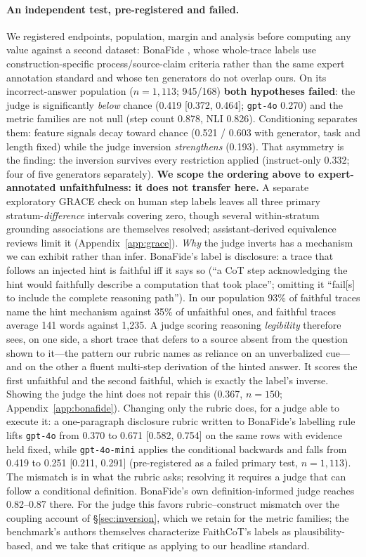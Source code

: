 \documentclass[11pt]{article}
\begin{document}
\paragraph{An independent test, pre-registered and failed.} We registered endpoints, population, margin and analysis before computing any value against a second dataset: BonaFide \citep{gurarieh2026bonafide}, whose whole-trace labels use construction-specific process/source-claim criteria rather than the same expert annotation standard and whose ten generators do not overlap ours. On its incorrect-answer population ($n{=}1{,}113$; 945/168) \textbf{both hypotheses failed}: the judge is significantly \emph{below} chance (0.419 [0.372, 0.464]; \texttt{gpt-4o} 0.270) and the metric families are not null (step count 0.878, NLI 0.826). Conditioning separates them: feature signals decay toward chance (0.521 / 0.603 with generator, task and length fixed) while the judge inversion \emph{strengthens} (0.193). That asymmetry is the finding: the inversion survives every restriction applied (instruct-only 0.332; four of five generators separately). \textbf{We scope the ordering above to expert-annotated unfaithfulness: it does not transfer here.} A separate exploratory GRACE check \citep{pham2026grace} on human step labels leaves all three primary stratum-\emph{difference} intervals covering zero, though several within-stratum grounding associations are themselves resolved; assistant-derived equivalence reviews limit it (Appendix~\ref{app:grace}). \emph{Why} the judge inverts has a mechanism we can exhibit rather than infer. BonaFide's label is disclosure: a trace that follows an injected hint is faithful iff it says so (``a CoT step acknowledging the hint would faithfully describe a computation that took place''; omitting it ``fail[s] to include the complete reasoning path''). In our population 93\% of faithful traces name the hint mechanism against 35\% of unfaithful ones, and faithful traces average 141 words against 1,235. A judge scoring reasoning \emph{legibility} therefore sees, on one side, a short trace that defers to a source absent from the question shown to it---the pattern our rubric names as reliance on an unverbalized cue---and on the other a fluent multi-step derivation of the hinted answer. It scores the first unfaithful and the second faithful, which is exactly the label's inverse. Showing the judge the hint does not repair this (0.367, $n{=}150$; Appendix~\ref{app:bonafide}). Changing only the rubric does, for a judge able to execute it: a one-paragraph disclosure rubric written to BonaFide's labelling rule lifts \texttt{gpt-4o} from 0.370 to 0.671 [0.582, 0.754] on the same rows with evidence held fixed, while \texttt{gpt-4o-mini} applies the conditional backwards and falls from 0.419 to 0.251 [0.211, 0.291] (pre-registered as a failed primary test, $n{=}1{,}113$). The mismatch is in what the rubric asks; resolving it requires a judge that can follow a conditional definition. BonaFide's own definition-informed judge reaches 0.82--0.87 there. For the judge this favors rubric--construct mismatch over the coupling account of \S\ref{sec:inversion}, which we retain for the metric families; the benchmark's authors themselves characterize FaithCoT's labels as plausibility-based, and we take that critique as applying to our headline standard.
\end{document}
